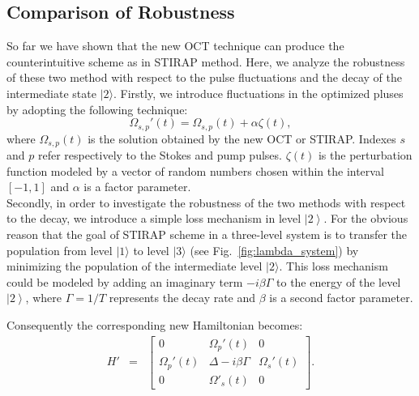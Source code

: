 \documentclass[]{interact}
\theoremstyle{plain}%
\theoremstyle{definition}
\theoremstyle{remark}
\begin{document}
\subsection{Comparison of Robustness}
So far we have shown that the new OCT technique can produce the 
counterintuitive scheme as in STIRAP method. Here, we analyze the robustness 
of these two method with respect to the pulse fluctuations and the decay of the 
intermediate state $|2\rangle$. 
Firstly, we introduce fluctuations in the optimized pluses by adopting 
the following technique:
\begin{equation}
  \Omega_{s,p}'(t) = \Omega_{s,p}(t) +\alpha \zeta(t),
\end{equation}
where $\Omega_{s,p}(t)$ is the solution obtained by the new OCT  or 
STIRAP. Indexes $s$ and $p$ refer respectively to the Stokes and 
pump pulses. $\zeta(t)$ is the perturbation function modeled by a vector of 
random numbers chosen within the interval $[-1, 1]$ and $\alpha$ is a factor 
parameter. 
\\ 
Secondly, in order to investigate the robustness of the two methods with 
respect to the decay, we introduce a simple loss mechanism in level 
$\left|2\right>$. 
For the obvious reason that the goal of STIRAP scheme in a three-level system 
is to transfer the population from level $|1\rangle$ to level 
$|3\rangle$ (see Fig.~\ref{fig:lambda_system}) by minimizing the population 
of the intermediate level $|2\rangle$. This loss mechanism could be 
modeled by adding an imaginary term $-i\beta\Gamma$ to the energy of the level 
$\left|2\right>$, where $\Gamma = 1/{T}$ represents the decay rate
and $\beta$ is a second factor parameter. 

Consequently the corresponding new Hamiltonian becomes:
 \begin{eqnarray}
   H' &=& 
     \begin{bmatrix}
        0 &  \Omega_p'(t) &  0 \\
       \Omega_p'(t) & \Delta -i\beta\Gamma &   \Omega_s'(t) \\
       0 &  \Omega'_s(t) &  0 
     \end{bmatrix}.
     \label{eq:Ham2}
   \end{eqnarray}
  
\end{document}
